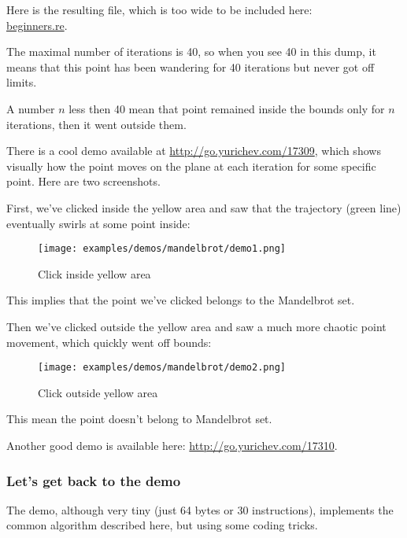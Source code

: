 

Here is the resulting file, 
which is too wide to be included here: \\
\href{http://go.yurichev.com/17164}{beginners.re}.

The maximal number of iterations is 40, so when you see 40 in this dump, it means that this point has been wandering
for 40 iterations but never got off limits. 

A number $n$ less then 40 mean that point remained inside the bounds only for $n$ iterations, 
then it went outside them.

\clearpage
There is a cool demo available at 
\url{http://go.yurichev.com/17309}, which shows
visually how the point moves on the plane at each iteration for some specific point. 
Here are two screenshots.

%
First, we've clicked inside the yellow area and saw that the trajectory (green line)
eventually swirls at some point inside:

\begin{figure}[H]
\centering
\texttt{[image: examples/demos/mandelbrot/demo1.png]}
\caption{Click inside yellow area}
\end{figure}


This implies that the point we've clicked belongs to the Mandelbrot set.

\clearpage

Then we've clicked outside the yellow area and saw a much more chaotic point movement, 
which quickly went off bounds:

\begin{figure}[H]
\centering
\texttt{[image: examples/demos/mandelbrot/demo2.png]}
\caption{Click outside yellow area}
\end{figure}

This mean the point doesn't belong to Mandelbrot set.

Another good demo is available here: 
\url{http://go.yurichev.com/17310}.

\clearpage
\subsubsection{Let's get back to the demo}


The demo, although very tiny (just 64 bytes or 30 instructions), implements the common algorithm 
described here, but using some coding tricks.

